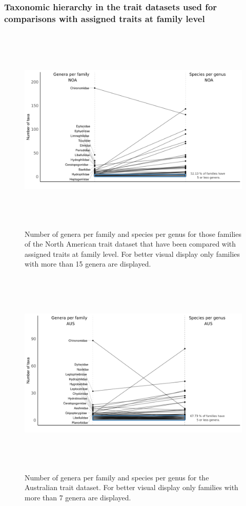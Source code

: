 \documentclass[12pt]{article}
\begin{document}
\subsubsection*{Taxonomic hierarchy in the trait datasets used for comparisons with assigned traits at family level}
\label{sec:taxonomic_hierarchy}

\begin{figure}[H]
    \centering
    \includegraphics[width=16.5cm, height=10cm]{taxonomic_hierarchy_NOA.png}
    \caption{Number of genera per family and species per genus for those families of the North American trait dataset that have been compared with assigned traits at family level. For better visual display only families with more than 15 genera are displayed.}
    \label{fig:tax_hierarchy_NOA}
\end{figure}

\begin{figure}[H]
    \centering
    \includegraphics[width=16.5cm, height=10cm]{taxonomic_hierarchy_AUS.png}
    \caption{Number of genera per family and species per genus for the Australian trait dataset. For better visual display only families with more than 7 genera are displayed.}
    \label{fig:tax_hierarchy_AUS}
\end{figure}
\end{document}

